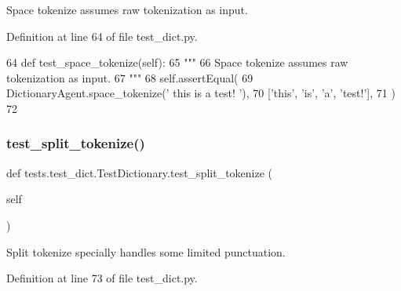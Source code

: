 \begin{DoxyVerb}Space tokenize assumes raw tokenization as input.
\end{DoxyVerb}
 

Definition at line 64 of file test\+\_\+dict.\+py.


\begin{DoxyCode}
64     \textcolor{keyword}{def }test\_space\_tokenize(self):
65         \textcolor{stringliteral}{"""}
66 \textcolor{stringliteral}{        Space tokenize assumes raw tokenization as input.}
67 \textcolor{stringliteral}{        """}
68         self.assertEqual(
69             DictionaryAgent.space\_tokenize(\textcolor{stringliteral}{'   this is a test!   '}),
70             [\textcolor{stringliteral}{'this'}, \textcolor{stringliteral}{'is'}, \textcolor{stringliteral}{'a'}, \textcolor{stringliteral}{'test!'}],
71         )
72 
\end{DoxyCode}
\mbox{\label{classtests_1_1test__dict_1_1TestDictionary_aa10a7901ffa04a2d0ba43b43b0a18f26}} 
\subsubsection{\texorpdfstring{test\+\_\+split\+\_\+tokenize()}{test\_split\_tokenize()}}
{\footnotesize\ttfamily def tests.\+test\+\_\+dict.\+Test\+Dictionary.\+test\+\_\+split\+\_\+tokenize (\begin{DoxyParamCaption}\item[{}]{self }\end{DoxyParamCaption})}

\begin{DoxyVerb}Split tokenize specially handles some limited punctuation.
\end{DoxyVerb}
 

Definition at line 73 of file test\+\_\+dict.\+py.


